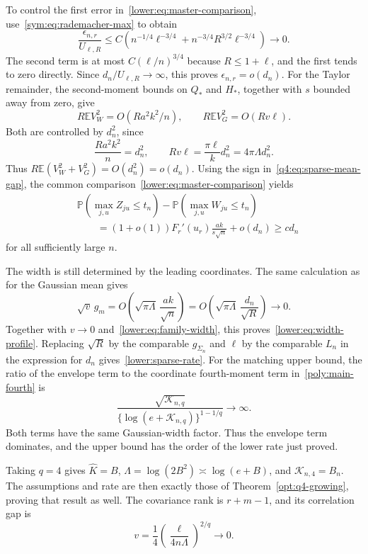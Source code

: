 \documentclass[11pt,letterpaper]{article}
\theoremstyle{remark}
\newcommand{\E}{\mathbb E}
\newcommand{\Pp}{\mathbb P}
\begin{document}
To control the first error in~\eqref{lower:eq:master-comparison},
use~\eqref{sym:eq:rademacher-max} to obtain
\[
 \frac{\epsilon_{n,r}}{U_{\ell,R}}
 \le C\left(n^{-1/4}\ell^{-3/4}
       +n^{-3/4}R^{3/2}\ell^{-3/4}\right)\to0.
\]
The second term is at most $C(\ell/n)^{3/4}$ because
$R\le1+\ell$, and the first tends to zero directly.
Since $d_n/U_{\ell,R}\to\infty$, this proves
$\epsilon_{n,r}=o(d_n)$.
For the Taylor remainder, the second-moment bounds on $Q_*$
and $H_*$, together with $s$ bounded away from zero, give
\[
 R\E V_W^2=O(Ra^2k^2/n),\qquad
 R\E V_G^2=O(Rv\ell).
\]
Both are controlled by $d_n^2$, since
\[
 \frac{Ra^2k^2}{n}=d_n^2,\qquad
 Rv\ell=\frac{\pi\ell}{k}d_n^2=4\pi\Lambda d_n^2.
\]
Thus $R\E(V_W^2+V_G^2)=O(d_n^2)=o(d_n)$.
Using the sign in~\eqref{q4:eq:sparse-mean-gap}, the common
comparison~\eqref{lower:eq:master-comparison} yields
\begin{equation}
\begin{split}
 &\Pp(\max_{j,u}Z_{ju}\le t_n)-\Pp(\max_{j,u}W_{ju}\le t_n)\\
 &\qquad=(1+o(1))F_r'(u_r)\frac{ak}{s\sqrt n}
           +o(d_n)\ge c d_n
\end{split}
 \label{q4:eq:sparse-orthant}
\end{equation}
for all sufficiently large $n$.

The width is still determined by the leading coordinates. The
same calculation as for the Gaussian mean gives
\[
 \sqrt v\,g_m
 =O\left(\sqrt{\pi\Lambda}\,\frac{ak}{\sqrt n}\right)
 =O\left(\sqrt{\pi\Lambda}\,\frac{d_n}{\sqrt R}\right)\to0.
\]
Together with $v\to0$ and~\eqref{lower:eq:family-width}, this
proves~\eqref{lower:eq:width-profile}. Replacing $\sqrt R$ by
the comparable $g_{\Sigma_n}$ and $\ell$ by the comparable
$L_n$ in the expression for $d_n$ gives~\eqref{lower:sparse-rate}.
For the matching upper bound, the ratio of the envelope term to
the coordinate fourth-moment term in~\eqref{poly:main-fourth} is
\[
 \frac{\sqrt{\mathcal K_{n,q}}}
 {\{\log(e+\mathcal K_{n,q})\}^{1-1/q}}\to\infty.
\]
Both terms have the same Gaussian-width factor. Thus the envelope
term dominates, and the upper bound has the order of the lower
rate just proved.

Taking $q=4$ gives $\widehat K=B$,
$\Lambda=\log(2B^2)\asymp\log(e+B)$, and
$\mathcal K_{n,4}=B_n$. The assumptions and rate are then
exactly those of Theorem~\ref{opt:q4-growing}, proving that
result as well. The covariance rank is $r+m-1$, and its
correlation gap is
\[
 v=\frac14\left(\frac{\ell}{4n\Lambda}\right)^{2/q}\to0.
\]
\end{document}
